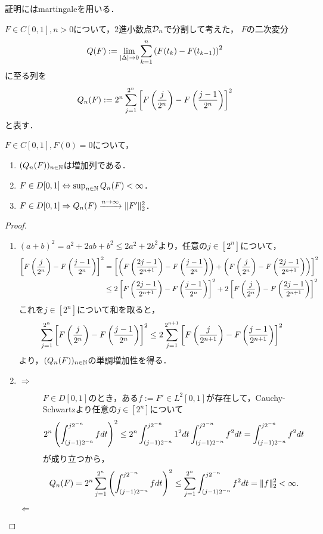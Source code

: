 \documentclass[uplatex,dvipdfmx]{jsreport}
\begin{document}
\begin{tcolorbox}[colframe=ForestGreen, colback=ForestGreen!10!white,breakable,colbacktitle=ForestGreen!40!white,coltitle=black,fonttitle=\bfseries\sffamily,
title=]
    証明にはmartingaleを用いる．
\end{tcolorbox}

\begin{notation}
    $F\in C[0,1],n>0$について，2進小数点$\mathcal{D}_n$で分割して考えた，
    $F$の二次変分
    \[Q(F):=\lim_{\lvert\Delta\rvert\to0}\sum_{k=1}^n\left(F(t_k)-F(t_{k-1})\right)^2\]
    に至る列を
    \[Q_n(F):=2^n\sum^{2^n}_{j=1}\left[F\left(\frac{j}{2^n}\right)-F\left(\frac{j-1}{2^n}\right)\right]^2\]
    と表す．
\end{notation}

\begin{lemma}
    $F\in C[0,1],F(0)=0$について，
    \begin{enumerate}
        \item $(Q_n(F))_{n\in\mathbb{N}}$は増加列である．
        \item $F\in D[0,1]\Leftrightarrow\sup_{n\in\mathbb{N}}Q_n(F)<\infty$．
        \item $F\in D[0,1]\Rightarrow Q_n(F)\xrightarrow{n\to\infty}\|F'\|^2_2$．
    \end{enumerate}
\end{lemma}
\begin{proof}\mbox{}
    \begin{enumerate}
        \item $(a+b)^2=a^2+2ab+b^2\le 2a^2+2b^2$より，任意の$j\in[2^n]$について，
        \begin{align*}
            \left[F\left(\frac{j}{2^n}\right)-F\left(\frac{j-1}{2^n}\right)\right]^2&=\left[\left(F\left(\frac{2j-1}{2^{n+1}}\right)-F\left(\frac{j-1}{2^n}\right)\right)+\left(F\left(\frac{j}{2^n}\right)-F\left(\frac{2j-1}{2^{n+1}}\right)\right)\right]^2\\
            &\le2\left[F\left(\frac{2j-1}{2^{n+1}}\right)-F\left(\frac{j-1}{2^n}\right)\right]^2+2\left[F\left(\frac{j}{2^n}\right)-F\left(\frac{2j-1}{2^{n+1}}\right)\right]^2
        \end{align*}
        これを$j\in[2^n]$について和を取ると，
        \[\sum^{2^n}_{j=1}\left[F\left(\frac{j}{2^n}\right)-F\left(\frac{j-1}{2^n}\right)\right]^2\le 2\sum^{2^{n+1}}_{j=1}\left[F\left(\frac{j}{2^{n+1}}\right)-F\left(\frac{j-1}{2^{n+1}}\right)\right]^2\]
        より，$(Q_n(F))_{n\in\mathbb{N}}$の単調増加性を得る．
        \item \begin{description}
            \item[$\Rightarrow$] $F\in D[0,1]$のとき，ある$f:=F'\in L^2[0,1]$が存在して，Cauchy-Schwartzより任意の$j\in[2^n]$について
            \[2^n\left(\int^{j2^{-n}}_{(j-1)2^{-n}}fdt\right)^2\le 2^n\int^{j2^{-n}}_{(j-1)2^{-n}}1^2dt\int^{j2^{-n}}_{(j-1)2^{-n}}f^2dt=\int^{j2^{-n}}_{(j-1)2^{-n}}f^2dt\]
            が成り立つから，
            \[Q_n(F)=2^n\sum^{2^n}_{j=1}\left(\int^{j2^{-n}}_{(j-1)2^{-n}}fdt\right)^2\le \sum^{2^n}_{j=1}\int^{j2^{-n}}_{(j-1)2^{-n}}f^2dt=\|f\|_2^2<\infty.\]
            \item[$\Leftarrow$]

        \end{description}
    \end{enumerate}
\end{proof}
\end{document}
